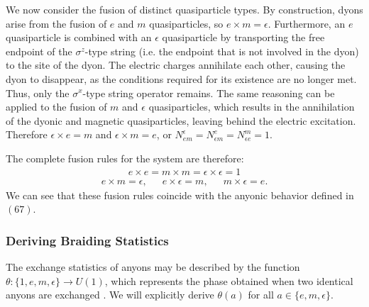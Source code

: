 \documentclass[12pt]{article}
\theoremstyle{definition}
\begin{document}
We now consider the fusion of distinct quasiparticle types. By construction, dyons arise from the fusion of $e$ and $m$ quasiparticles, so $e\times m = \epsilon$. Furthermore, an $e$ quasiparticle is combined with an $\epsilon$ quasiparticle by transporting the free endpoint of the $\sigma^z$-type string (i.e. the endpoint that is not involved in the dyon) to the site of the dyon. The electric charges annihilate each other, causing the dyon to disappear, as the conditions required for its existence are no longer met. Thus, only the $\sigma^x$-type string operator remains. The same reasoning can be applied to the fusion of $m$ and $\epsilon$ quasiparticles, which results in the annihilation of the dyonic and magnetic quasiparticles, leaving behind the electric excitation. Therefore $\epsilon\times e = m$ and $\epsilon\times m = e$, or $N^\epsilon_{em} = N^e_{\epsilon m} = N^m_{\epsilon e} = 1$.\newline

The complete fusion rules for the system are therefore:
    \begin{align}
        e\times e = m\times m = \epsilon\times\epsilon = 1
    \end{align}
    \begin{align}
        e\times m = \epsilon,\enspace\enspace\enspace e\times\epsilon = m,\enspace\enspace\enspace m\times\epsilon = e.
    \end{align}
We can see that these fusion rules coincide with the anyonic behavior defined in $(67)$.

\subsubsection{Deriving Braiding Statistics}
The exchange statistics of anyons may be described by the function $\theta:\{1,e,m,\epsilon\}\rightarrow U(1)$, which represents the phase obtained when two identical anyons are exchanged \cite{ellison2022}. We will explicitly derive $\theta(a)$ for all $a\in\{e,m,\epsilon\}$.\newline
\end{document}
